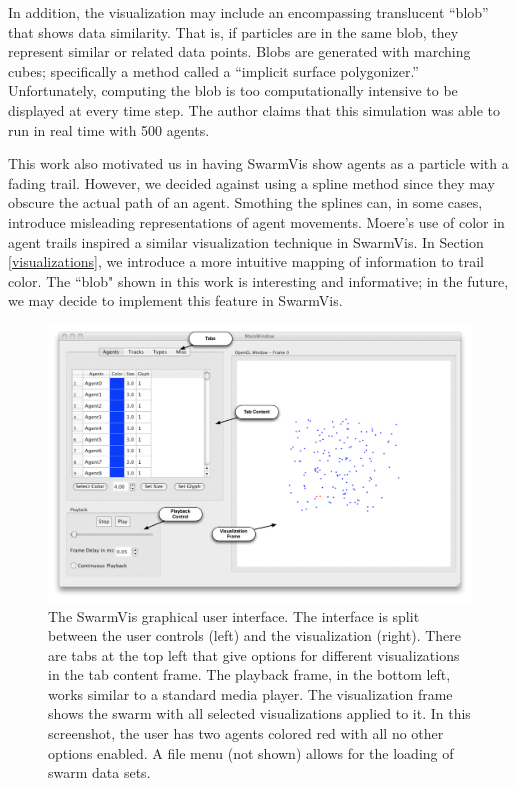 \documentclass[conference]{IEEEtran}
\begin{document}
In addition, the visualization may include an encompassing translucent ``blob'' that shows data similarity.
That is, if particles are in the same blob, they represent similar or related data points.
Blobs are generated with marching cubes; specifically a method called a ``implicit surface polygonizer.''
Unfortunately, computing the blob is too computationally intensive to be displayed at every time step.
The author claims that this simulation was able to run in real time with 500 agents.

This work also motivated us in having SwarmVis show agents as a particle with a fading trail.
However, we decided against using a spline method since they may obscure the actual path of an agent.
Smothing the splines can, in some cases, introduce misleading representations of agent movements.
Moere's use of color in agent trails inspired a similar visualization technique in SwarmVis.
In Section \ref{visualizations}, we introduce a more intuitive mapping of information to trail color.
The ``blob" shown in this work is interesting and informative;
in the future, we may decide to implement this feature in SwarmVis.


\begin{figure}[ht]
\centering
\includegraphics[scale=.45]{images/swarmvis-annotated.pdf}
\caption{The SwarmVis graphical user interface. 
The interface is split between the user controls (left) and the visualization (right).
There are tabs at the top left that give options for different visualizations in the tab content frame.
The playback frame, in the bottom left, works similar to a standard media player.
The visualization frame shows the swarm with all selected visualizations applied to it.
In this screenshot, the user has two agents colored red with all no other options enabled.
A file menu (not shown) allows for the loading of swarm data sets.}
\label{AnnotatedWindow}
\end{figure}
\end{document}
